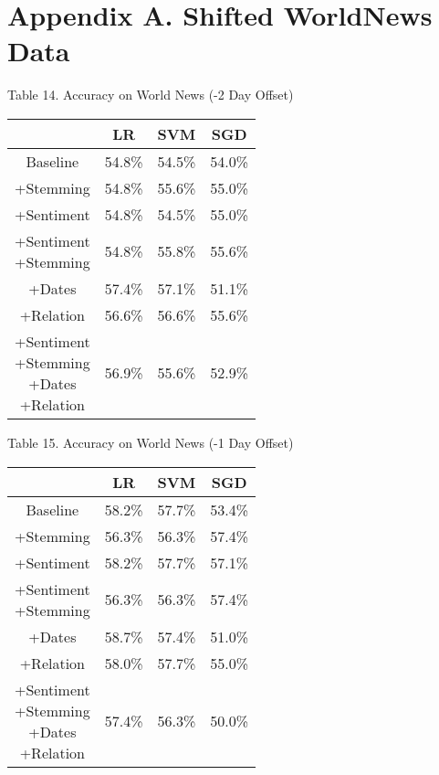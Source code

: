 \documentclass[11pt,a4paper]{article}
\begin{document}
\section{Appendix A. Shifted WorldNews Data}

\begin{center}
Table 14. Accuracy on World News (-2 Day Offset)\\
\begin{tabular}{ |c|c|c|c| }
 \hline
  & LR & SVM & SGD \\
  \hline
  Baseline & 54.8\% & 54.5\% & 54.0\% \\
  \hline
 +Stemming & 54.8\% & 55.6\% & 55.0\% \\
  \hline
 +Sentiment & 54.8\% & 54.5\%  & 55.0\% \\
  \hline
  \shortstack{+Sentiment \\ +Stemming} & 54.8\% & 55.8\% & 55.6\%\\
 \hline
 +Dates & 57.4\% & 57.1\% & 51.1\% \\
  \hline
 +Relation & 56.6\%& 56.6\% & 55.6\% \\
  \hline
  \shortstack{+Sentiment \\ +Stemming \\+Dates \\+Relation} & 56.9\% & 55.6\% & 52.9\% \\
 \hline
\end{tabular}
\end{center}

\begin{center}
Table 15. Accuracy on World News (-1 Day Offset)\\
\begin{tabular}{ |c|c|c|c| }
 \hline
  & LR & SVM & SGD \\
  \hline
  Baseline & 58.2\% & 57.7\% & 53.4\% \\
  \hline
 +Stemming & 56.3\% & 56.3\% & 57.4\% \\
  \hline
 +Sentiment & 58.2\% & 57.7\% & 57.1\% \\
  \hline
  \shortstack{+Sentiment \\ +Stemming} & 56.3\% & 56.3\% & 57.4\%\\
 \hline
 +Dates & 58.7\% & 57.4\% & 51.0\% \\
  \hline
 +Relation & 58.0\% & 57.7\% & 55.0\% \\
  \hline
  \shortstack{+Sentiment \\ +Stemming \\+Dates \\+Relation} & 57.4\% & 56.3\% & 50.0\% \\
 \hline
\end{tabular}
\end{center}
\end{document}
